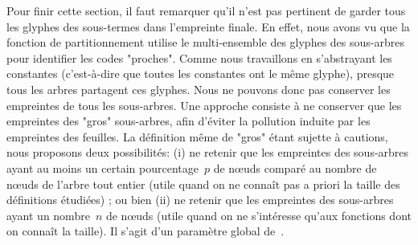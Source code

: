 Pour finir cette section, il faut remarquer qu'il n'est pas pertinent
de garder tous les glyphes des sous-termes dans l'empreinte finale.
En effet, nous avons vu que la fonction de partitionnement utilise le
multi-ensemble des glyphes des sous-arbres pour identifier les
codes "proches". Comme nous travaillons en s'abstrayant les constantes
(c'est-à-dire que toutes les constantes ont le même glyphe), presque
tous les arbres partagent ces glyphes. Nous ne pouvons donc pas
conserver les empreintes de tous les sous-arbres.
%
Une approche consiste à ne conserver que les empreintes des "gros"
sous-arbres, afin d'éviter la pollution induite par les empreintes des
feuilles. La définition même de "gros" étant sujette à cautions, nous
proposons deux possibilités: (i) ne retenir que les empreintes des
sous-arbres ayant au moins un certain pourcentage~$p$ de nœuds comparé
au nombre de nœuds de l'arbre tout entier (utile quand on ne connaît
pas a priori la taille des définitions étudiées) ; ou bien (ii) ne
retenir que les empreintes des sous-arbres ayant un nombre~$n$ de
nœuds (utile quand on ne s'intéresse qu'aux fonctions dont on connaît
la taille). Il s'agit d'un paramètre global de~{\Asak}.
